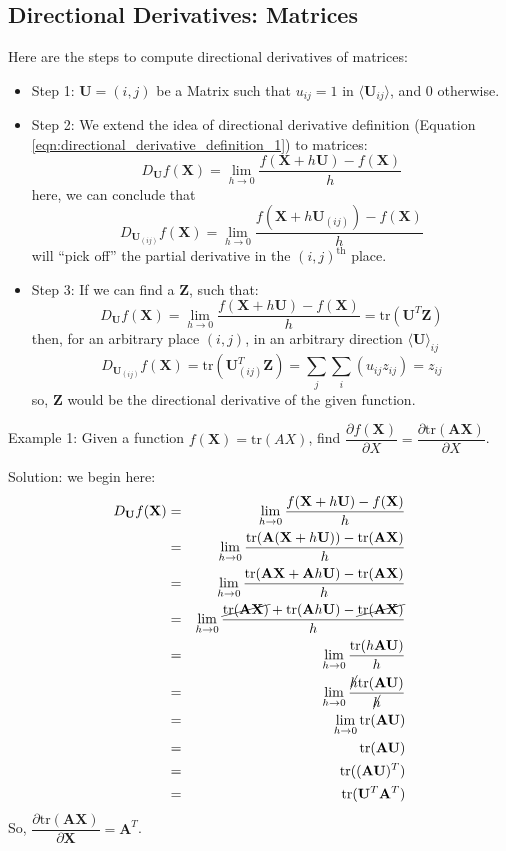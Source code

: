 \documentclass[conference,final,11pt,technote,onecolumn]{IEEEtran}\usepackage[]{graphicx}\usepackage[]{color}
\begin{document}
\subsection{Directional Derivatives: Matrices}
Here are the steps to compute directional derivatives of matrices\cite{pres:withoutATrace}:
\begin{itemize}
	\item Step 1: $\mathbf{U}=(i,j)$ be a Matrix such that $u_{ij}=1$ in $\langle \mathbf{U}_{ij}\rangle$, and 0 otherwise.
	\item Step 2: We extend the idea of directional derivative definition (Equation \ref{eqn:directional_derivative_definition_1}) to matrices:
	\[ D_{\mathbf{U}}f(\mathbf{X}) = \lim_{h\rightarrow 0}\dfrac{f(\mathbf{X}+h\mathbf{U})-f(\mathbf{X})}{h}\]
	here, we can conclude that
	\[ D_{\mathbf{U}_{(ij)}}f(\mathbf{X}) = \lim_{h\rightarrow 0}\dfrac{f(\mathbf{X}+h\mathbf{U}_{(ij)})-f(\mathbf{X})}{h}\]
	will ``pick off'' the partial derivative in the $(i,j)^\text{th}$ place.
	\item Step 3: If we can find a $\mathbf{Z}$, such that:
	\[ D_{\mathbf{U}}f(\mathbf{X}) = \lim_{h\rightarrow 0}\dfrac{f(\mathbf{X}+h\mathbf{U})-f(\mathbf{X})}{h} = \text{tr}(\mathbf{U}^T\mathbf{Z})\]
	then, for an arbitrary place $(i,j)$, in an arbitrary direction $\langle \mathbf{U}\rangle_{ij}$ \[ D_{\mathbf{U}_{(ij)}}f(\mathbf{X}) =  \text{tr}(\mathbf{U}^T_{(ij)}\mathbf{Z}) = \sum_j\sum_i(u_{ij}z_{ij}) = z_{ij}\]
	so, $\mathbf{Z}$ would be the directional derivative of the given function.
\end{itemize}
Example 1: Given a function $f(\mathbf{X}) = \text{tr}(AX)$, find $\dfrac{\partial f(\mathbf{X})}{\partial X} = \dfrac{\partial \text{tr}(\mathbf{AX})}{\partial X}$.

Solution: we begin here:
\begin{eqnarray}
\nonumber D_\mathbf{U}f(\mathbf{X}) &=& \lim_{h\rightarrow 0}\dfrac{f(\mathbf{X}+h\mathbf{U})-f(\mathbf{X})}{h}\\
\nonumber &=& \lim_{h\rightarrow 0}\dfrac{\text{tr}(\mathbf{A}(\mathbf{X}+h\mathbf{U}))-\text{tr}(\mathbf{AX})}{h}\\
\nonumber &=& \lim_{h\rightarrow 0}\dfrac{\text{tr}(\mathbf{A}\mathbf{X}+\mathbf{A}h\mathbf{U})-\text{tr}(\mathbf{AX})}{h}\\
\nonumber &=& \lim_{h\rightarrow 0}\dfrac{\cancel{\text{tr}(\mathbf{A}\mathbf{X})}+\text{tr}(\mathbf{A}h\mathbf{U})-\cancel{\text{tr}(\mathbf{AX})}}{h}\\
\nonumber &=& \lim_{h\rightarrow 0}\dfrac{\text{tr}(h\mathbf{A}\mathbf{U})}{h}\\
\nonumber &=& \lim_{h\rightarrow 0}\dfrac{\cancel{h}\text{tr}(\mathbf{A}\mathbf{U})}{\cancel{h}}\\
\nonumber &=& \lim_{h\rightarrow 0}\text{tr}(\mathbf{AU})\\
\nonumber &=& \text{tr}(\mathbf{AU})\\
\nonumber &=& \text{tr}((\mathbf{AU})^T)\\
\nonumber &=& \text{tr}(\mathbf{U}^T\mathbf{A}^T)
\end{eqnarray}
So, $\dfrac{\partial \text{tr}(\mathbf{AX})}{\partial \mathbf{X}} = \mathbf{A}^T$.
\end{document}
